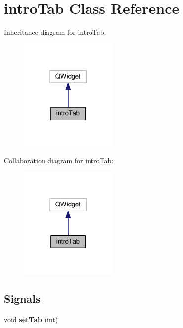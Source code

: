 \hypertarget{classintroTab}{}\section{intro\+Tab Class Reference}
\label{classintroTab}


Inheritance diagram for intro\+Tab\+:\nopagebreak
\begin{figure}[H]
\begin{center}
\leavevmode
\includegraphics[width=135pt]{classintroTab__inherit__graph}
\end{center}
\end{figure}


Collaboration diagram for intro\+Tab\+:\nopagebreak
\begin{figure}[H]
\begin{center}
\leavevmode
\includegraphics[width=135pt]{classintroTab__coll__graph}
\end{center}
\end{figure}
\subsection*{Signals}
\begin{DoxyCompactItemize}
\item 
\mbox{\label{classintroTab_a76fc0e265d1a76c808dae9671b9248b4}} 
void {\bfseries set\+Tab} (int)
\end{DoxyCompactItemize}
